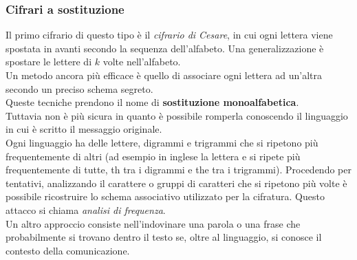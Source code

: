 \documentclass[10pt,a4paper,twoside]{article}
\begin{document}
\subsubsection{Cifrari a sostituzione}
Il primo cifrario di questo tipo è il \textit{cifrario di Cesare}, in cui ogni lettera viene spostata in avanti secondo la sequenza dell'alfabeto. Una generalizzazione è spostare le lettere di $k$ volte nell'alfabeto.\\
Un metodo ancora più efficace è quello di associare ogni lettera ad un'altra secondo un preciso schema segreto.\\
Queste tecniche prendono il nome di \textbf{sostituzione monoalfabetica}.\\
Tuttavia non è più sicura in quanto è possibile romperla conoscendo il linguaggio in cui è scritto il messaggio originale.\\
Ogni linguaggio ha delle lettere, digrammi e trigrammi che si ripetono più frequentemente di altri (ad esempio in inglese la lettera e si ripete più frequentemente di tutte, th tra i digrammi e the tra i trigrammi). Procedendo per tentativi, analizzando il carattere o gruppi di caratteri che si ripetono più volte è possibile ricostruire lo schema associativo utilizzato per la cifratura.
Questo attacco si chiama \textit{analisi di frequenza}.\\
Un altro approccio consiste nell'indovinare una parola o una frase che probabilmente si trovano dentro il testo se, oltre al linguaggio, si conosce il contesto della comunicazione. 
\end{document}
